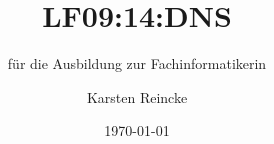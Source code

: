 \documentclass[]{beamer}
\title{LF09:14:DNS}
\subtitle{für die Ausbildung zur Fachinformatikerin}
\institute[GS-LDK]{Gewerbliche Schulen Dillenburg}
\author{Karsten Reincke}
\date{\today}
\def\cfgGl{../../../cfg.gl/}
\begin{document}

\begin{frame}
  \titlepage

  
\end{frame}






\logo{}
\newpage



%
\end{document}

